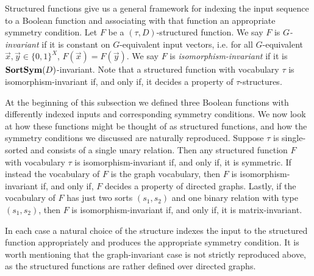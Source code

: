 \documentclass[../paper.tex]{subfiles}
\begin{document}

Structured functions give us a general framework for indexing the input sequence
to a Boolean function and associating with that function an appropriate symmetry
condition. Let $F$ be a $(\tau, D)$-structured function. We say $F$ is
\emph{$G$-invariant} if it is constant on $G$-equivalent input vectors, i.e. for
all $G$-equivalent $\vec{x}, \vec{y} \in \{0,1\}^{X}$, $F(\vec{x}) =
F(\vec{y})$. We say $F$ is \emph{isomorphism-invariant} if it is $\text{\textbf{SortSym}}
(D)$-invariant. Note that a structured function with vocabulary $\tau$ is
isomorphism-invariant if, and only if, it decides a property of
$\tau$-structures.

At the beginning of this subsection we defined three Boolean functions with
differently indexed inputs and corresponding symmetry conditions. We now look at
how these functions might be thought of as structured functions, and how the
symmetry conditions we discussed are naturally reproduced. Suppose $\tau$ is
single-sorted and consists of a single unary relation. Then any structured
function $F$ with vocabulary $\tau$ is isomorphism-invariant if, and only if, it
is symmetric. If instead the vocabulary of $F$ is the graph vocabulary, then $F$
is isomorphism-invariant if, and only if, $F$ decides a property of directed
graphs. Lastly, if the vocabulary of $F$ has just two sorts $(s_1, s_2)$ and one
binary relation with type $(s_1, s_2)$, then $F$ is isomorphism-invariant if,
and only if, it is matrix-invariant.

In each case a natural choice of the structure indexes the input to the
structured function appropriately and produces the appropriate symmetry
condition. It is worth mentioning that the graph-invariant case is not strictly
reproduced above, as the structured functions are rather defined over directed
graphs.
\end{document}
